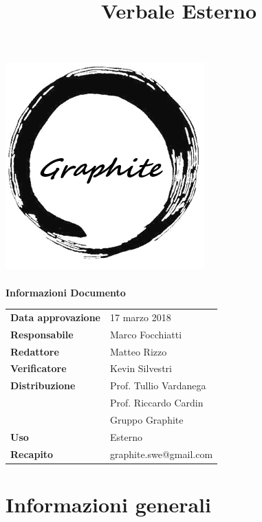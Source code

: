 \documentclass[openany,12pt,a4paper]{article}
\title{Verbale Esterno}
\author{}
\begin{document}
 
  \makeatletter 
  \begin{titlepage} 
    \setlength{\headsep}{0pt}   
    \begin{center} 
      \includegraphics[width=0.5\linewidth]{Logo.png}\\[1em] 
      {\huge \bfseries  \@title }\\[10ex] 
      \textbf{\Large Informazioni Documento} \\[2em] 
      \bgroup 
      \def\arraystretch{1.5} 
      \begin{tabular}{l|l} 
        \textbf{Data approvazione} & 17 marzo 2018 \\ 
        \textbf{Responsabile} & Marco Focchiatti \\ 
        \textbf{Redattore} & Matteo Rizzo \\ 
        \textbf{Verificatore} & Kevin Silvestri \\ 
        \textbf{Distribuzione} & Prof. Tullio Vardanega \\ 
         & Prof. Riccardo Cardin \\ 
         & Gruppo Graphite \\ 
        \textbf{Uso} & Esterno \\ 
        \textbf{Recapito} & graphite.swe@gmail.com \\ 
      \end{tabular} 
    \egroup 
    \end{center} 
  \end{titlepage} 
  \makeatother 
 
  \thispagestyle{empty} 
  \newpage 
   
  \tableofcontents 
  \newpage 
   
  \section{Informazioni generali} 
   
\end{document}
